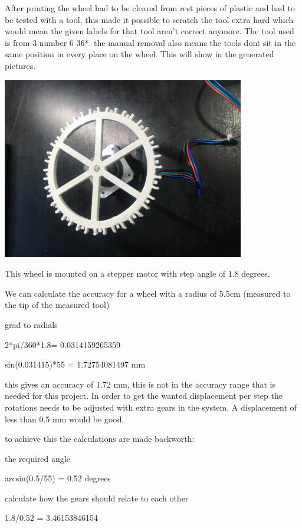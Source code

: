 \documentclass{scrartcl}
\begin{document}
After printing the wheel had to be cleared from rest pieces of plastic and had to be tested with a tool, this made it possible to scratch the tool extra hard which would mean the given labels for that tool aren't correct anymore. The tool used is from 3 number 6 36*. the manual removal also means the tools dont sit in the same position in every place on the wheel. This will show in the generated pictures.

\includegraphics[height=3.125000in, keepaspectratio=true]{./first_wheel_holder/radhouder_horizontal.jpeg}



This wheel is mounted on a stepper motor with step angle of 1.8 degrees.

We can calculate the accuracy for a wheel with a radius of 5.5cm (measured to the tip of the measured tool) 

grad to radials

2*pi/360*1.8= 0.0314159265359

sin(0.031415)*55 = 1.72754081497 mm



this gives an accuracy of 1.72 mm, this is not in the accuracy range that is needed for this project. In order to get the wanted displacement per step the rotations needs to be adjusted with extra gears in the system. A displacement of less than 0.5 mm would be good.



to achieve this the calculations are made backworth:

the required angle

arcsin(0.5/55) = 0.52 degrees 

calculate how the gears should relate to each other

1.8/0.52 = 3.46153846154
\end{document}
